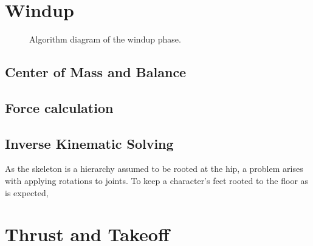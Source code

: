 \section{Windup}
\begin{figure}[ht]
	\label{fig:bendPhase}
	\centering
	\resizebox{\textwidth}{!}{
		
	}
	\caption{Algorithm diagram of the windup phase.}
\end{figure}
\subsection{Center of Mass and Balance}
\subsection{Force calculation}


\subsection{Inverse Kinematic Solving}
As the skeleton is a hierarchy assumed to be rooted at the hip, a problem arises with applying rotations to joints.  To keep a character's feet rooted to the floor as is expected, 


\section{Thrust and Takeoff}